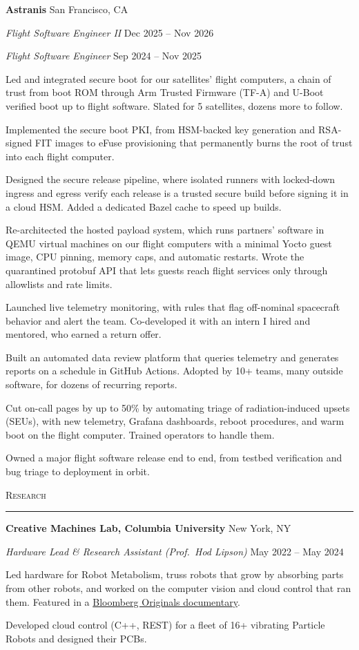 \documentclass[11pt, letterpaper]{article}
\newcommand{\link}[2]{\href{#1}{\textcolor{linkink}{#2}}}
\newcommand{\sectionhead}[1]{%
  \par\vspace{4pt}%
  {\large\scshape #1}\par
  \vspace{-6pt}\rule{\linewidth}{0.4pt}\par
  \vspace{1pt}}
\newcommand{\role}[4]{%
  \par\vspace{3pt}%
  \textbf{#1} \hfill #2\par
  \textit{#3} \hfill #4\par}
\newcommand{\subrole}[2]{%
  \par\vspace{2pt}%
  \textit{#1} \hfill #2\par}
\newenvironment{bullets}{%
  \begin{list}{\textbullet}{%
    \setlength{\leftmargin}{1.1em}%
    \setlength{\labelsep}{0.45em}%
    \setlength{\labelwidth}{0.65em}%
    \setlength{\itemsep}{0.5pt}%
    \setlength{\parsep}{0pt}%
    \setlength{\topsep}{1.5pt}%
    \setlength{\partopsep}{0pt}}}%
  {\end{list}}
\newcommand{\meta}[1]{{\small #1}}
\begin{document}
\role{Astranis}{San Francisco, CA}{Flight Software Engineer II}{Dec 2025 -- Nov 2026}
\subrole{Flight Software Engineer}{Sep 2024 -- Nov 2025}
\begin{bullets}
  \item Led and integrated secure boot for our satellites' flight computers, a chain of trust from boot ROM through Arm
        Trusted Firmware (TF-A) and U-Boot verified boot up to flight software. Slated for 5 satellites, dozens more to follow.
  \item Implemented the secure boot PKI, from HSM-backed key generation and RSA-signed FIT images to eFuse provisioning
        that permanently burns the root of trust into each flight computer.
  \item Designed the secure release pipeline, where isolated runners with locked-down ingress and egress verify each release
        is a trusted secure build before signing it in a cloud HSM. Added a dedicated Bazel cache to speed up builds.
  \item Re-architected the hosted payload system, which runs partners' software in QEMU virtual machines on our flight
        computers with a minimal Yocto guest image, CPU pinning, memory caps, and automatic restarts. Wrote the quarantined
        protobuf API that lets guests reach flight services only through allowlists and rate limits.
  \item Launched live telemetry monitoring, with rules that flag off-nominal spacecraft behavior and alert the team.
        Co-developed it with an intern I hired and mentored, who earned a return offer.
  \item Built an automated data review platform that queries telemetry and generates reports on a schedule in GitHub
        Actions. Adopted by 10+ teams, many outside software, for dozens of recurring reports.
  \item Cut on-call pages by up to 50\% by automating triage of radiation-induced upsets (SEUs), with new telemetry,
        Grafana dashboards, reboot procedures, and warm boot on the flight computer. Trained operators to handle them.
  \item Owned a major flight software release end to end, from testbed verification and bug triage to deployment in orbit.
\end{bullets}

\sectionhead{Research}

\role{Creative Machines Lab, Columbia University}{New York, NY}{Hardware Lead \& Research Assistant \meta{(Prof.\ Hod Lipson)}}{May 2022 -- May 2024}
\begin{bullets}
  \item Led hardware for Robot Metabolism, truss robots that grow by absorbing parts from other robots, and worked on
        the computer vision and cloud control that ran them. Featured in a \link{https://www.youtube.com/watch?v=sK5_pQV_QEA}{Bloomberg Originals documentary}.
  \item Developed cloud control (C++, REST) for a fleet of 16+ vibrating Particle Robots and designed their PCBs.
\end{bullets}
\end{document}
